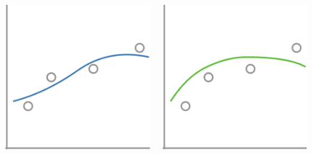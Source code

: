 \documentclass[presentation]{subfiles}
\begin{document}
\begin{frame}[t]
\begin{columns}
\begin{column}{0.16\textwidth}
{\includegraphics[width=\textwidth]{figures/sla_2.png}}


\end{column}

\begin{column}{0.16\textwidth}

{\includegraphics[width=\textwidth]{figures/slb_3.png}}


\end{column}
\end{columns}
\end{frame}
\end{document}
